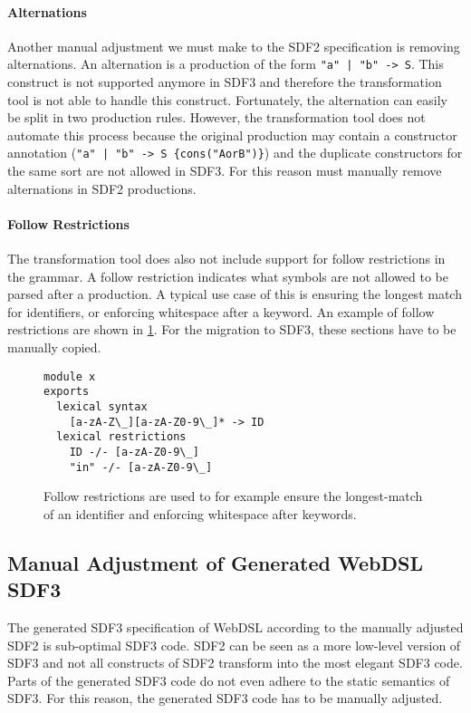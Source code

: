       \paragraph{Alternations} Another manual adjustment we must make to the SDF2 specification is removing alternations. An alternation is a production of the form \texttt{"a" | "b" -> S}. This construct is not supported anymore in SDF3 and therefore the transformation tool is not able to handle this construct. Fortunately, the alternation can easily be split in two production rules. However, the transformation tool does not automate this process because the original production may contain a constructor annotation (\texttt{"a" | "b" -> S \{cons("AorB")\}}) and the duplicate constructors for the same sort are not allowed in SDF3. For this reason must manually remove alternations in SDF2 productions.

      \paragraph{Follow Restrictions} The transformation tool does also not include support for follow restrictions in the grammar. A follow restriction indicates what symbols are not allowed to be parsed after a production. A typical use case of this is ensuring the longest match for identifiers, or enforcing whitespace after a keyword. An example of follow restrictions are shown in \cref{fig:sdf2-follow-restrictions}. For the migration to SDF3, these sections have to be manually copied.

      \begin{figure}
        \begin{verbatim}
module x
exports
  lexical syntax
    [a-zA-Z\_][a-zA-Z0-9\_]* -> ID
  lexical restrictions
    ID -/- [a-zA-Z0-9\_]
    "in" -/- [a-zA-Z0-9\_]
        \end{verbatim}
        \caption{\label{fig:sdf2-follow-restrictions}Follow restrictions are used to for example ensure the longest-match of an identifier and enforcing whitespace after keywords.}
      \end{figure}

    \subsection{\label{subsec:manual-tweaking-sdf3}Manual Adjustment of Generated WebDSL SDF3}

      The generated SDF3 specification of WebDSL according to the manually adjusted SDF2 is sub-optimal SDF3 code. SDF2 can be seen as a more low-level version of SDF3 and not all constructs of SDF2 transform into the most elegant SDF3 code. Parts of the generated SDF3 code do not even adhere to the static semantics of SDF3. For this reason, the generated SDF3 code has to be manually adjusted.

